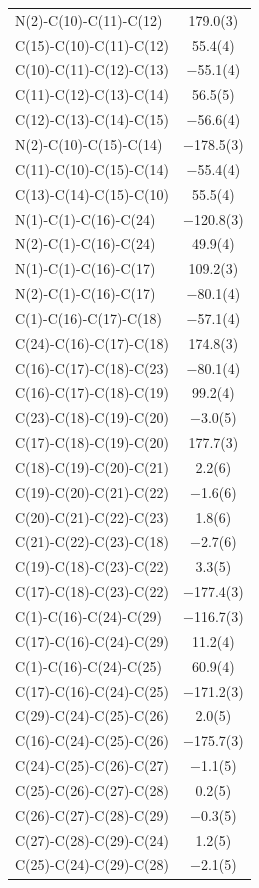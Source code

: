 \begin{center}
{\begin{supertabular}{p{1.5in}c}
N(2)-C(10)-C(11)-C(12)&179.0(3)\\
C(15)-C(10)-C(11)-C(12)&55.4(4)\\
C(10)-C(11)-C(12)-C(13)&$-$55.1(4)\\
C(11)-C(12)-C(13)-C(14)&56.5(5)\\
C(12)-C(13)-C(14)-C(15)&$-$56.6(4)\\
N(2)-C(10)-C(15)-C(14)&$-$178.5(3)\\
C(11)-C(10)-C(15)-C(14)&$-$55.4(4)\\
C(13)-C(14)-C(15)-C(10)&55.5(4)\\
N(1)-C(1)-C(16)-C(24)&$-$120.8(3)\\
N(2)-C(1)-C(16)-C(24)&49.9(4)\\
N(1)-C(1)-C(16)-C(17)&109.2(3)\\
N(2)-C(1)-C(16)-C(17)&$-$80.1(4)\\
C(1)-C(16)-C(17)-C(18)&$-$57.1(4)\\
C(24)-C(16)-C(17)-C(18)&174.8(3)\\
C(16)-C(17)-C(18)-C(23)&$-$80.1(4)\\
C(16)-C(17)-C(18)-C(19)&99.2(4)\\
C(23)-C(18)-C(19)-C(20)&$-$3.0(5)\\
C(17)-C(18)-C(19)-C(20)&177.7(3)\\
C(18)-C(19)-C(20)-C(21)&2.2(6)\\
C(19)-C(20)-C(21)-C(22)&$-$1.6(6)\\
C(20)-C(21)-C(22)-C(23)&1.8(6)\\
C(21)-C(22)-C(23)-C(18)&$-$2.7(6)\\
C(19)-C(18)-C(23)-C(22)&3.3(5)\\
C(17)-C(18)-C(23)-C(22)&$-$177.4(3)\\
C(1)-C(16)-C(24)-C(29)&$-$116.7(3)\\
C(17)-C(16)-C(24)-C(29)&11.2(4)\\
C(1)-C(16)-C(24)-C(25)&60.9(4)\\
C(17)-C(16)-C(24)-C(25)&$-$171.2(3)\\
C(29)-C(24)-C(25)-C(26)&2.0(5)\\
C(16)-C(24)-C(25)-C(26)&$-$175.7(3)\\
C(24)-C(25)-C(26)-C(27)&$-$1.1(5)\\
C(25)-C(26)-C(27)-C(28)&0.2(5)\\
C(26)-C(27)-C(28)-C(29)&$-$0.3(5)\\
C(27)-C(28)-C(29)-C(24)&1.2(5)\\
C(25)-C(24)-C(29)-C(28)&$-$2.1(5)\\

\end{supertabular}}
\end{center}
